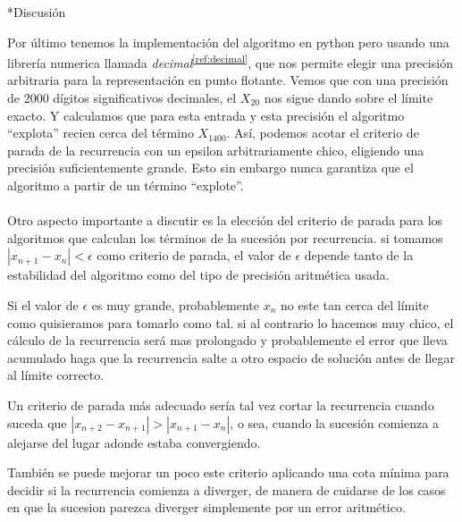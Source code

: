 \documentclass[12pt,titlepage]{article}
\newenvironment{usection}[1]{\newpage\begin{section}*{#1}	\addcontentsline{toc}{section}{#1}}{\end{section}}
\newcommand{\superref}[1]{\textsuperscript{\ref{#1}}}
\begin{document}
\begin{usection}{Discusión}
		Por último tenemos la implementación del algoritmo en python
		pero usando una librería numerica llamada \textit{decimal}\superref{ref:decimal},
		que nos permite elegir una precisión arbitraria para
		la representación en punto flotante.
		Vemos que con una precisión de 2000 dígitos significativos decimales,
		el $X_{20}$ nos sigue dando sobre el límite exacto.
		Y calculamos que para esta entrada y esta precisión
		el algoritmo ``explota'' recien cerca del término $X_{1400}$.
		Así, podemos acotar el criterio de parada de la recurrencia
		con un epsilon arbitrariamente chico, eligiendo una precisión
		suficientemente grande. Esto sin embargo nunca garantiza
		que el algoritmo a partir de un término ``explote''. \\
\\
		Otro aspecto importante a discutir es la elección
		del criterio de parada para los algoritmos
		que calculan los términos de la sucesión por recurrencia.
		si tomamos $|x_{n+1}-x_n| < \epsilon$ como criterio de parada,
		el valor de $\epsilon$ depende tanto de la estabilidad
		del algoritmo como del tipo de precisión aritmética usada.

		Si el valor de $\epsilon$ es muy grande, probablemente $x_n$
		no este tan cerca del límite como quisieramos para tomarlo como tal.
		si al contrario lo hacemos muy chico, el cálculo de la recurrencia
		será mas prolongado y probablemente el error que lleva acumulado
		haga que la recurrencia salte a otro espacio de solución antes de llegar al límite correcto.

		Un criterio de parada más adecuado sería tal vez
		cortar la recurrencia cuando suceda que
		$|x_{n+2}-x_{n+1}| > |x_{n+1}-x_n|$, o sea, cuando la sucesión
		comienza a alejarse del lugar adonde estaba convergiendo.

		También se puede mejorar un poco este criterio
		aplicando una cota mínima para decidir
		si la recurrencia comienza a diverger, de manera
		de cuidarse de los casos en que la sucesion parezca diverger
		simplemente por un error aritmético.

	\end{usection}
	
\end{document}
